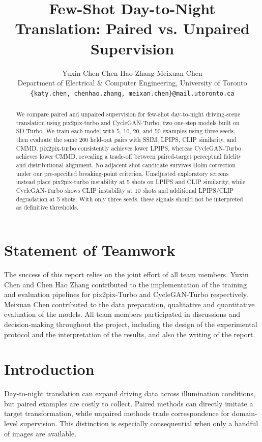 \documentclass{article}
\title{Few-Shot Day-to-Night Translation: Paired vs. Unpaired Supervision}
\author{%
  Yuxin Chen \quad Chen Hao Zhang \quad Meixuan Chen\\
  Department of Electrical \& Computer Engineering, University of Toronto\\
  \texttt{\{katy.chen, chenhao.zhang, meixan.chen\}@mail.utoronto.ca}
}
\begin{document}
\maketitle

\begin{abstract}
We compare paired and unpaired supervision for few-shot day-to-night driving-scene translation using pix2pix-turbo and CycleGAN-Turbo, two one-step models built on SD-Turbo. We train each model with 5, 10, 20, and 50 examples using three seeds, then evaluate the same 200 held-out pairs with SSIM, LPIPS, CLIP similarity, and CMMD. pix2pix-turbo consistently achieves lower LPIPS, whereas CycleGAN-Turbo achieves lower CMMD, revealing a trade-off between paired-target perceptual fidelity and distributional alignment. No adjacent-shot candidate survives Holm correction under our pre-specified breaking-point criterion. Unadjusted exploratory screens instead place pix2pix-turbo instability at 5 shots on LPIPS and CLIP similarity, while CycleGAN-Turbo shows CLIP instability at 10 shots and additional LPIPS/CLIP degradation at 5 shots. With only three seeds, these signals should not be interpreted as definitive thresholds.
\end{abstract}

\section*{Statement of Teamwork}
The success of this report relies on the joint effort of all team members. Yuxin Chen and Chen Hao Zhang contributed to the implementation of the training and evaluation pipelines for pix2pix-Turbo and CycleGAN-Turbo respectively. Meixuan Chen contributed to the data preparation, qualitative and quantitative evaluation of the models. All team members participated in discussions and decision-making throughout the project, including the design of the experimental protocol and the interpretation of the results, and also the writing of the report.

\section{Introduction}

Day-to-night translation can expand driving data across illumination conditions, but paired examples are costly to collect. Paired methods can directly imitate a target transformation, while unpaired methods trade correspondence for domain-level supervision. This distinction is especially consequential when only a handful of images are available.
\end{document}
